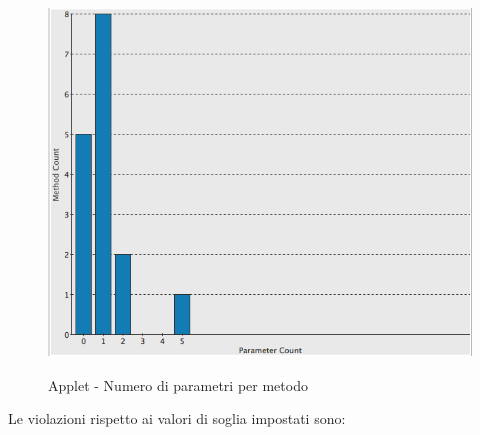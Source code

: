 \begin{figure}[htbp]
  \centering
  \includegraphics[height=10cm]{img/PQ/NumberOfParametersAPPLET.png}
\caption{Applet - Numero di parametri per metodo}
\end{figure}

\newpage

Le violazioni rispetto ai valori di soglia impostati sono:

